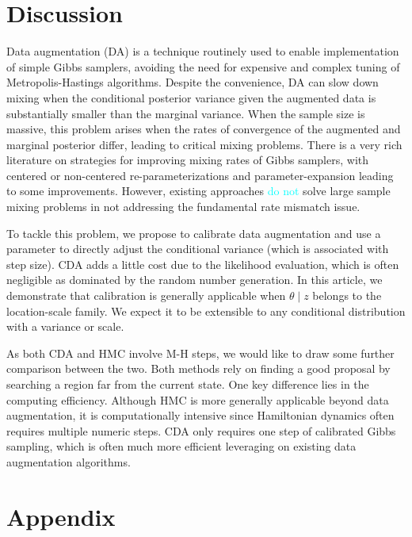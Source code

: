 \documentclass[11pt]{article}
\newcommand{\dave}[1]{{\textcolor{cyan}{#1}}}
\begin{document}
\section{Discussion}
Data augmentation (DA) is a technique routinely used to enable implementation of simple Gibbs samplers, avoiding the need for expensive and complex tuning of Metropolis-Hastings algorithms.
Despite the convenience, DA can slow down mixing when the conditional posterior variance given the augmented data is substantially smaller than the marginal variance.  When the sample size is massive, this problem arises when the rates of convergence of the augmented and marginal posterior differ, leading to 
critical mixing problems.  There is a very rich literature on strategies for improving mixing rates of Gibbs samplers, with centered or non-centered re-parameterizations \citep{papaspiliopoulos2007general} and parameter-expansion \citep{liu1999parameter} leading to some improvements.  However, existing approaches \dave{do not} solve large sample mixing problems in not addressing the fundamental rate
mismatch issue.

To tackle this problem, we propose to calibrate data augmentation and use a parameter to directly adjust the conditional variance (which is associated with step size).  CDA adds a little cost due to the likelihood evaluation, which is often negligible as dominated by the random number generation. In this article, we demonstrate that calibration is generally applicable when $\theta \mid z$ belongs to the location-scale family. We expect it to be extensible to any conditional distribution with a variance or scale.

As both CDA and HMC involve M-H steps, we would like to draw some further comparison between the two. Both methods rely on finding a good proposal by searching a region far from the current state. One key difference lies in the computing efficiency. Although HMC is more generally applicable beyond data augmentation, it is computationally intensive since Hamiltonian dynamics often requires multiple numeric steps. CDA only requires one step of calibrated Gibbs sampling, which is often much more efficient leveraging on existing data augmentation algorithms.



\appendix
\section{Appendix}
\end{document}
